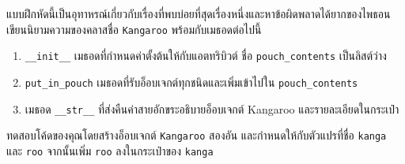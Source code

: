 \begin{exercise}
\label{kangaroo}



แบบฝึกหัดนี้เป็นอุทาหรณ์เกี่ยวกับเรื่องที่พบบ่อยที่สุดเรื่องหนึ่งและหาข้อผิดพลาดได้ยากของไพธอน
เขียนนิยามความของคลาสชื่อ {\tt Kangaroo} พร้อมกับเมธอดต่อไปนี้

\begin{enumerate}


\item  \verb"__init__" เมธอดที่กำหนดค่าตั้งต้นให้กับแอตทริบิวต์ ชื่อ \verb"pouch_contents" เป็นลิสต์ว่าง


\item \verb"put_in_pouch" เมธอดที่รับอ็อบเจกต์ทุกชนิดและเพิ่มเข้าไปใน \verb"pouch_contents"


\item เมธอด \verb"__str__" ที่ส่งคืนค่าสายอักขระอธิบายอ็อบเจกต์ Kangaroo และรายละเอียดในกระเป๋า

\end{enumerate}
%

ทดสอบโค้ดของคุณโดยสร้างอ็อบเจกต์ {\tt Kangaroo} สองอัน และกำหนดให้กับตัวแปรที่ชื่อ {\tt kanga} และ {\tt roo} 
จากนั้นเพิ่ม {\tt roo} ลงในกระเป๋าของ {\tt kanga}



\end{exercise}
